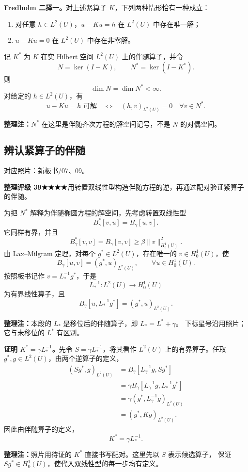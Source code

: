 \documentclass[UTF8,a4paper,11pt,fontset=fandol]{ctexart}
\newcommand{\ednote}[1]{\par{\small\color{notegray}\textbf{整理注：}#1}\par}
\newcommand{\source}[1]{{\small\color{notegray}对应照片：#1。}\par}
\newcommand{\proofstars}[1]{\ensuremath{%
\ifnum#1>0\relax\bigstar\fi
\ifnum#1>1\relax\bigstar\fi
\ifnum#1>2\relax\bigstar\fi
\ifnum#1>3\relax\bigstar\fi
\ifnum#1>4\relax\bigstar\fi}}
\newcommand{\proofrating}[3]{\par{\small\color{proofblue}%
\textbf{整理评级 #1}\enspace\proofstars{#2}\quad #3\par}}
\begin{document}
\textbf{Fredholm 二择一。}对上述紧算子 $K$，下列两种情形恰有一种成立：
\begin{enumerate}
\item 对任意 $h\in L^2(U)$，$u-Ku=h$ 在 $L^2(U)$ 中存在唯一解；
\item $u-Ku=0$ 在 $L^2(U)$ 中存在非零解。
\end{enumerate}
记 $K^*$ 为 $K$ 在实 Hilbert 空间 $L^2(U)$ 上的伴随算子，并令
\[
N=\ker(I-K),\qquad N^*=\ker(I-K^*).
\]
则
\[
\boxed{\dim N=\dim N^*<\infty.}
\]
对给定的 $h\in L^2(U)$，有
\[
\boxed{u-Ku=h\text{ 可解}
\quad\Longleftrightarrow\quad
(h,v)_{L^2(U)}=0\quad\forall v\in N^*.}
\]
\ednote{$N^*$ 在这里是伴随齐次方程的解空间记号，不是 $N$ 的对偶空间。}

\newpage
\subsection{辨认紧算子的伴随}
\source{新板书/07、09}
\proofrating{39}{4}{用转置双线性型构造伴随方程的逆，再通过配对验证紧算子的伴随。}
为把 $N^*$ 解释为伴随椭圆方程的解空间，先考虑转置双线性型
\[
B_\gamma^*[v,u]=B_\gamma[u,v].
\]
它同样有界，并且
\[
B_\gamma^*[v,v]=B_\gamma[v,v]\geq\beta\|v\|_{H_0^1(U)}^2.
\]
由 Lax--Milgram 定理，对每个 $g^*\in L^2(U)$，存在唯一的 $v\in H_0^1(U)$，使
\[
B_\gamma[u,v]=(g^*,u)_{L^2(U)},\qquad\forall u\in H_0^1(U).
\]
按照板书记作 $v=L_*^{-1}g^*$，于是
\[
L_*^{-1}:L^2(U)\longrightarrow H_0^1(U)
\]
为有界线性算子，且
\[
B_\gamma[u,L_*^{-1}g^*]=(g^*,u)_{L^2(U)}.
\]
\ednote{本段的 $L_*$ 是移位后的伴随算子，即 $L_*=L^*+\gamma$。
下标星号沿用照片；它与未移位的 $L^*$ 有区别。}

\textbf{证明 $K^*=\gamma L_*^{-1}$。}先令 $S=\gamma L_*^{-1}$，将其看作
$L^2(U)$ 上的有界算子。任取 $g^*,g\in L^2(U)$，由两个逆算子的定义，
\[
\begin{aligned}
(Sg^*,g)_{L^2(U)}
&=B_\gamma[L_\gamma^{-1}g,Sg^*]\\
&=\gamma B_\gamma[L_\gamma^{-1}g,L_*^{-1}g^*]\\
&=\gamma(g^*,L_\gamma^{-1}g)_{L^2(U)}\\
&=(g^*,Kg)_{L^2(U)}.
\end{aligned}
\]
因此由伴随算子的定义，
\[
\boxed{K^*=\gamma L_*^{-1}.}
\]
\ednote{照片用待证的 $K^*$ 直接书写配对。这里先以 $S$ 表示候选算子，
保证 $Sg^*\in H_0^1(U)$，使代入双线性型的每一步均有定义。}

\newpage
\end{document}
